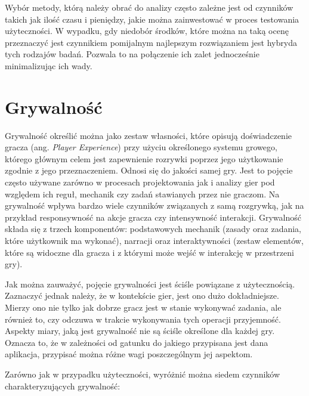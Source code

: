 \documentclass[a4paper,12pt,numbers=noenddot]{report}
\begin{document}
Wybór metody, którą należy obrać do analizy często zależne jest od czynników takich jak ilość czasu i pieniędzy, jakie można zainwestować w proces testowania użyteczności. W wypadku, gdy niedobór środków, które można na taką ocenę przeznaczyć jest czynnikiem pomijalnym najlepszym rozwiązaniem jest hybryda tych rodzajów badań. Pozwala to na połączenie ich zalet jednocześnie minimalizując ich wady.

\section{Grywalność}
Grywalność określić można jako zestaw własności, które opisują doświadczenie gracza (ang. \textit{Player Experience}) przy użyciu określonego systemu growego, którego głównym celem jest zapewnienie rozrywki poprzez jego użytkowanie zgodnie z jego przeznaczeniem. \cite{art_Playability} Odnosi się do jakości samej gry. Jest to pojęcie często używane zarówno w procesach projektowania jak i analizy gier pod względem ich reguł, mechanik czy zadań stawianych przez nie graczom. Na grywalność wpływa bardzo wiele czynników związanych z samą rozgrywką, jak na przykład responsywność na akcje gracza czy intensywność interakcji.
Grywalność składa się z trzech komponentów: podstawowych mechanik (zasady oraz zadania, które użytkownik ma wykonać), narracji oraz interaktywności (zestaw elementów, które są widoczne dla gracza i z którymi może wejść w interakcję w przestrzeni gry). \cite{art_UserExperience}

Jak można zauważyć, pojęcie grywalności jest ściśle powiązane z użytecznością. Zaznaczyć jednak należy, że w kontekście gier, jest ono dużo dokładniejsze. Mierzy ono nie tylko jak dobrze gracz jest w stanie wykonywać zadania, ale również to, czy odczuwa w trakcie wykonywania tych operacji przyjemność. Aspekty miary, jaką jest grywalność nie są ściśle określone dla każdej gry. Oznacza to, że w zależności od gatunku do jakiego przypisana jest dana aplikacja, przypisać można różne wagi poszczególnym jej aspektom.

Zarówno jak w przypadku użyteczności, wyróżnić można siedem czynników charakteryzujących grywalność:
\end{document}

